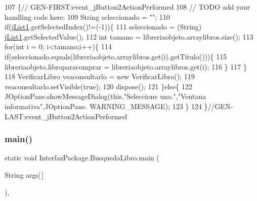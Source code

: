 \begin{DoxyCode}
107                                                                          \{\textcolor{comment}{//
      GEN-FIRST:event\_jButton2ActionPerformed}
108         \textcolor{comment}{// TODO add your handling code here:}
109         String seleccionado = \textcolor{stringliteral}{""};
110         \textcolor{keywordflow}{if}(\mbox{\hyperlink{class_interfaz_package_1_1_busqueda_libro_a44542e61409368d4f638e77765ab785f}{jList1}}.getSelectedIndex()!=(-1))\{
111             seleccionado = (String) \mbox{\hyperlink{class_interfaz_package_1_1_busqueda_libro_a44542e61409368d4f638e77765ab785f}{jList1}}.getSelectedValue();
112             \textcolor{keywordtype}{int} tamano = libreriaobjeto.arraylibros.size();
113             \textcolor{keywordflow}{for}(\textcolor{keywordtype}{int} i = 0; i<tamano;i++)\{
114                  \textcolor{keywordflow}{if}(seleccionado.equals(libreriaobjeto.arraylibros.get(i).getTitulo()))\{
115                        libreriaobjeto.libroparacomprar = libreriaobjeto.arraylibros.get(i);
116                  \}
117             \}
118             VerificarLibro veaconsultarlo = \textcolor{keyword}{new} VerificarLibro();
119             veaconsultarlo.setVisible(\textcolor{keyword}{true});
120             dispose();
121         \}\textcolor{keywordflow}{else}\{
122             JOptionPane.showMessageDialog(\textcolor{keyword}{this},\textcolor{stringliteral}{"Seleccione uno."},\textcolor{stringliteral}{"Ventana informativa"},JOptionPane.
      WARNING\_MESSAGE);
123         \}
124     \}\textcolor{comment}{//GEN-LAST:event\_jButton2ActionPerformed}
\end{DoxyCode}
\mbox{\label{class_interfaz_package_1_1_busqueda_libro_ae0833ceb18c926afdfe5bf3c379b70b3}} 
\subsubsection{\texorpdfstring{main()}{main()}}
{\footnotesize\ttfamily static void Interfaz\+Package.\+Busqueda\+Libro.\+main (\begin{DoxyParamCaption}\item[{String}]{args\mbox{[}$\,$\mbox{]} }\end{DoxyParamCaption})\hspace{0.3cm}{\ttfamily [inline]}, {\ttfamily [static]}}


